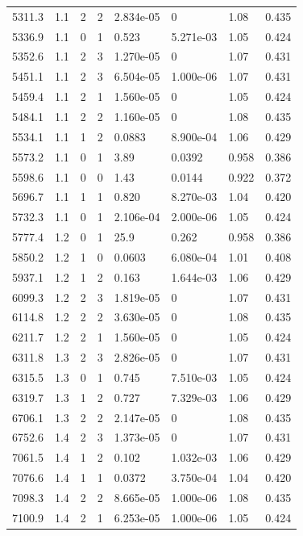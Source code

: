 \documentclass[preview]{standalone}
\begin{document}
{{{\begin{tabular}{L{1.2cm}C{1.2cm} C{0.3cm}C{0.5cm} C{1.4cm}C{1.4cm} C{1.4cm}C{1.4cm}}
  5311.3  &   1.1  & 2     &  2 &  2.834e-05  & 0  & 1.08 &  0.435   \\ 
  5336.9  &   1.1  & 0     &  1 &  0.523  & 5.271e-03  & 1.05 &  0.424   \\ 
  5352.6  &   1.1  & 2     &  3 &  1.270e-05  & 0  & 1.07 &  0.431   \\ 
  5451.1  &   1.1  & 2     &  3 &  6.504e-05  & 1.000e-06  & 1.07 &  0.431   \\ 
  5459.4  &   1.1  & 2     &  1 &  1.560e-05  & 0  & 1.05 &  0.424   \\ 
  5484.1  &   1.1  & 2     &  2 &  1.160e-05  & 0  & 1.08 &  0.435   \\ 
  5534.1  &   1.1  & 1     &  2 &  0.0883  & 8.900e-04  & 1.06 &  0.429   \\ 
  5573.2  &   1.1  & 0     &  1 &  3.89  & 0.0392  & 0.958 &  0.386   \\ 
  5598.6  &   1.1  & 0     &  0 &  1.43  & 0.0144  & 0.922 &  0.372   \\ 
  5696.7  &   1.1  & 1     &  1 &  0.820  & 8.270e-03  & 1.04 &  0.420   \\ 
  5732.3  &   1.1  & 0     &  1 &  2.106e-04  & 2.000e-06  & 1.05 &  0.424   \\ 
  5777.4  &   1.2  & 0     &  1 &  25.9  & 0.262  & 0.958 &  0.386   \\ 
  5850.2  &   1.2  & 1     &  0 &  0.0603  & 6.080e-04  & 1.01 &  0.408   \\ 
  5937.1  &   1.2  & 1     &  2 &  0.163  & 1.644e-03  & 1.06 &  0.429   \\ 
  6099.3  &   1.2  & 2     &  3 &  1.819e-05  & 0  & 1.07 &  0.431   \\ 
  6114.8  &   1.2  & 2     &  2 &  3.630e-05  & 0  & 1.08 &  0.435   \\ 
  6211.7  &   1.2  & 2     &  1 &  1.560e-05  & 0  & 1.05 &  0.424   \\ 
  6311.8  &   1.3  & 2     &  3 &  2.826e-05  & 0  & 1.07 &  0.431   \\ 
  6315.5  &   1.3  & 0     &  1 &  0.745  & 7.510e-03  & 1.05 &  0.424   \\ 
  6319.7  &   1.3  & 1     &  2 &  0.727  & 7.329e-03  & 1.06 &  0.429   \\ 
  6706.1  &   1.3  & 2     &  2 &  2.147e-05  & 0  & 1.08 &  0.435   \\ 
  6752.6  &   1.4  & 2     &  3 &  1.373e-05  & 0  & 1.07 &  0.431   \\ 
  7061.5  &   1.4  & 1     &  2 &  0.102  & 1.032e-03  & 1.06 &  0.429   \\ 
  7076.6  &   1.4  & 1     &  1 &  0.0372  & 3.750e-04  & 1.04 &  0.420   \\ 
  7098.3  &   1.4  & 2     &  2 &  8.665e-05  & 1.000e-06  & 1.08 &  0.435   \\ 
  7100.9  &   1.4  & 2     &  1 &  6.253e-05  & 1.000e-06  & 1.05 &  0.424   \\ 
\hline 
\end{tabular} 

}}}
\end{document}
